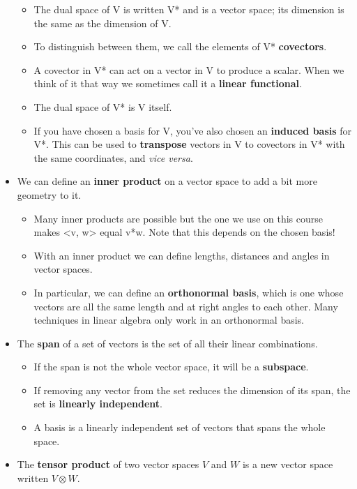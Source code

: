 \documentclass[oneside,english]{amsbook}
\numberwithin{section}{chapter}
\theoremstyle{plain}
\theoremstyle{definition}
\begin{document}
\begin{itemize}
	\begin{itemize}
		\item
		The dual space of V is written V* and is a vector space; its
		dimension is the same as the dimension of V.
		\item
		To distinguish between them, we call the elements of V*
		\textbf{covectors}.
		\item
		A covector in V* can act on a vector in V to produce a scalar. When
		we think of it that way we sometimes call it a \textbf{linear
			functional}.
		\item
		The dual space of V* is V itself.
		\item
		If you have chosen a basis for V, you've also chosen an
		\textbf{induced basis} for V*. This can be used to
		\textbf{transpose} vectors in V to covectors in V* with the same
		coordinates, and \emph{vice versa}.
	\end{itemize}
	\item
	We can define an \textbf{inner product} on a vector space to add a bit
	more geometry to it.
	
	\begin{itemize}
		\item
		Many inner products are possible but the one we use on this course
		makes \textless v, w\textgreater{} equal v*w. Note that this depends
		on the chosen basis!
		\item
		With an inner product we can define lengths, distances and angles in
		vector spaces.
		\item
		In particular, we can define an \textbf{orthonormal basis}, which is
		one whose vectors are all the same length and at right angles to
		each other. Many techniques in linear algebra only work in an
		orthonormal basis.
	\end{itemize}
	\item
	The \textbf{span} of a set of vectors is the set of all their linear
	combinations.
	
	\begin{itemize}
		\item
		If the span is not the whole vector space, it will be a
		\textbf{subspace}.
		\item
		If removing any vector from the set reduces the dimension of its
		span, the set is \textbf{linearly independent}.
		\item
		A basis is a linearly independent set of vectors that spans the
		whole space.
	\end{itemize}
	\item
	The \textbf{tensor product} of two vector spaces $V$ and $W$ is a new
	vector space written $V\otimes W$.
	

\end{itemize}
\end{document}

